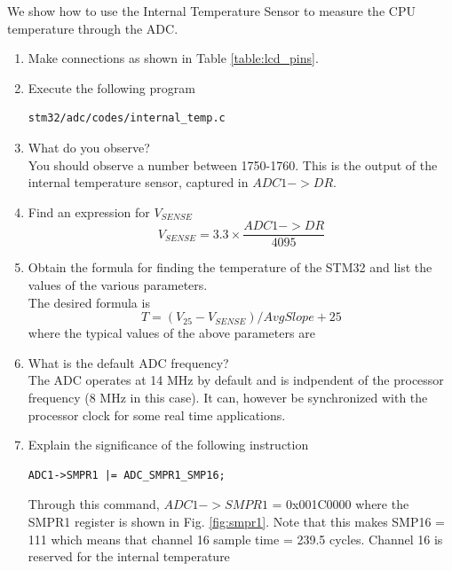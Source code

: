 We show how to use the Internal Temperature Sensor to measure the CPU temperature through the ADC.
\begin{enumerate}[label=\arabic*.,ref=\theenumi]
\item Make connections as shown in Table \ref{table:lcd_pins}.
\item Execute the following program
\begin{lstlisting}
stm32/adc/codes/internal_temp.c
\end{lstlisting}
\item What do you observe?
\\
\solution You should observe a number between 1750-1760. This is the output of the internal temperature
sensor, captured in $ADC1->DR$.
\item Find an expression for $V_{SENSE}$
\\
\solution
\begin{equation}
V_{SENSE} = 3.3 \times \frac{ADC1->DR}{4095}
\end{equation}
%
\item Obtain the formula for finding the temperature of the STM32 and list the values of the various parameters.
\\
\solution The desired formula is
\begin{equation}
T = (V_{25}-V_{SENSE})/AvgSlope + 25
\end{equation}
where the typical values of the above parameters are 

%
\item What is the default ADC frequency?
\\
\solution The ADC operates at 14 MHz by default and is indpendent of the processor frequency (8 MHz in this case). It can, however be synchronized with
the processor clock for some real time applications.
\item Explain the significance of the following instruction
\begin{lstlisting}
ADC1->SMPR1 |= ADC_SMPR1_SMP16;
\end{lstlisting}
\solution Through this command, $ADC1->SMPR1$ = 0x001C0000 where the SMPR1 register is shown in Fig. \ref{fig:smpr1}.  Note that
this makes SMP16 = 111 which means that channel 16 sample time = 239.5 cycles.  Channel 16 is reserved for the internal temperature 

\end{enumerate}
